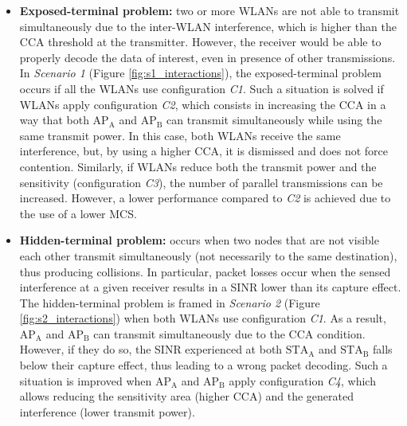 \documentclass[preprint,12pt]{elsarticle}
\begin{document}
\begin{itemize}		
	\item \textbf{Exposed-terminal problem:} two or more WLANs are not able to transmit simultaneously due to the inter-WLAN interference, which is higher than the CCA threshold at the transmitter. However, the receiver would be able to properly decode the data of interest, even in presence of other transmissions. In \emph{Scenario 1} (Figure \ref{fig:s1_interactions}), the exposed-terminal problem occurs if all the WLANs use configuration \emph{C1}. Such a situation is solved if WLANs apply configuration \emph{C2}, which consists in increasing the CCA in a way that both $\text{AP}_\text{A}$ and $\text{AP}_\text{B}$ can transmit simultaneously while using the same transmit power. In this case, both WLANs receive the same interference, but, by using a higher CCA, it is dismissed and does not force contention. Similarly, if WLANs reduce both the transmit power and the sensitivity (configuration \emph{C3}), the number of parallel transmissions can be increased. However, a lower performance compared to \emph{C2} is achieved due to the use of a lower MCS.		
	\item \textbf{Hidden-terminal problem:} occurs when two nodes that are not visible each other transmit simultaneously (not necessarily to the same destination), thus producing collisions. In particular, packet losses occur when the sensed interference at a given receiver results in a SINR lower than its capture effect. The hidden-terminal problem is framed in \emph{Scenario 2} (Figure \ref{fig:s2_interactions}) when both WLANs use configuration \emph{C1}. As a result, $\text{AP}_\text{A}$ and $\text{AP}_\text{B}$ can transmit simultaneously due to the CCA condition. However, if they do so, the SINR experienced at both $\text{STA}_\text{A}$ and $\text{STA}_\text{B}$ falls below their capture effect, thus leading to a wrong packet decoding. Such a situation is improved when $\text{AP}_\text{A}$ and $\text{AP}_\text{B}$ apply configuration \emph{C4}, which allows reducing the sensitivity area (higher CCA) and the generated interference (lower transmit power).		

\end{itemize}
\end{document}
